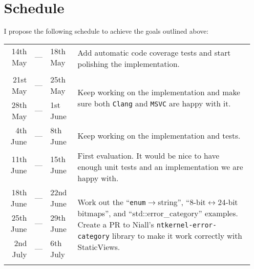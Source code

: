 \documentclass[a4paper,12pt]{article}
\begin{document}
\newpage
\section*{Schedule}
    I propose the following schedule to achieve the goals outlined above:

    \begin{center}
    \begin{tabular}{|r c l|p{10cm}|}
        \hline \noalign{\smallskip}
        14th May    & --- & 18th May    & \multirow{2}{10cm}{%
            Add automatic code coverage tests and start polishing the
            implementation.%
        } \\
                    &     &             & \\
        \noalign{\smallskip} \hline \noalign{\smallskip}
        21st May    & --- & 25th May    & \multirow{2}{10cm}{%
            Keep working on the implementation and make sure both \texttt{Clang}
            and \texttt{MSVC} are happy with it.%
        } \\
        28th May    & --- & 1st  June   & \\
        \noalign{\smallskip} \hline \noalign{\smallskip}
        4th  June   & --- & 8th  June   & Keep working on the implementation and
                                          tests. \\
        \noalign{\smallskip} \hline \noalign{\smallskip}
        11th June   & --- & 15th June   & \multirow{2}{10cm}{%
            First evaluation. It would be nice to have enough unit tests and an
            implementation we are happy with.
        } \\
                    &     &             & \\
        \noalign{\smallskip} \hline \noalign{\smallskip}
        18th June   & --- & 22nd June   & \multirow{4}{10cm}{%
            Work out the ``\texttt{enum}$\to$string'',
            ``8-bit$\leftrightarrow$24-bit bitmaps'', and
            ``std::error\_category'' examples. Create a PR to Niall's
            \texttt{ntkernel-error-category}\cite{ntkernel-error-category}
            library to make it work correctly with StaticViews.
        } \\
        25th June   & --- & 29th June   & \\
        2nd  July   & --- & 6th  July   & \\
                    &     &             & \\

\end{tabular}
\end{center}
\end{document}
